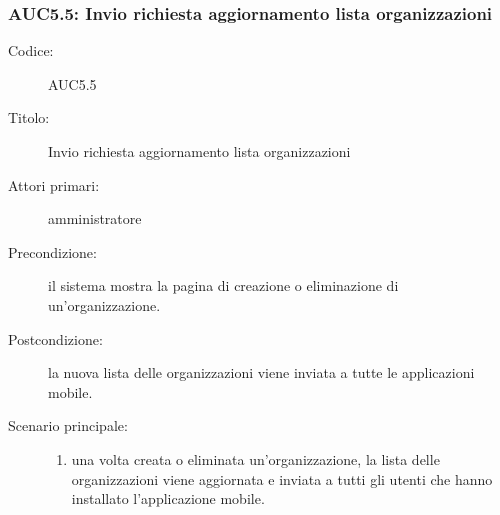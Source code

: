 \documentclass[../../../analisi-dei-requisiti.tex]{subfiles}
\begin{document}
\subsubsection{AUC5.5: Invio richiesta aggiornamento lista organizzazioni}%
\label{subs:AUC5.5}
\begin{description}
  \item[Codice:] AUC5.5
  \item[Titolo:] Invio richiesta aggiornamento lista organizzazioni
  \item[Attori primari:] amministratore
  \item[Precondizione:] il sistema mostra la pagina di creazione o eliminazione di un'organizzazione.
  \item[Postcondizione:] la nuova lista delle organizzazioni viene inviata a tutte le applicazioni mobile.
  \item[Scenario principale:]
  \begin{enumerate}
    \item una volta creata o eliminata un'organizzazione, la lista delle organizzazioni viene aggiornata e inviata a tutti gli utenti che hanno installato l'applicazione mobile.
  \end{enumerate}
\end{description}
\end{document}
